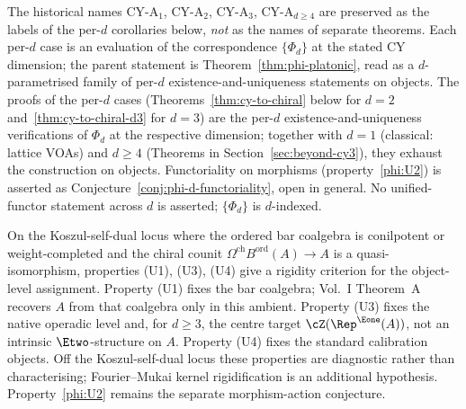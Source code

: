 \begin{remark}
\label{rem:phi-per-d-evaluations}
The historical names CY-A$_1$, CY-A$_2$, CY-A$_3$, CY-A$_{d \geq 4}$ are preserved as the labels of the per-$d$ corollaries below, \emph{not} as the names of separate theorems. Each per-$d$ case is an evaluation of the correspondence $\{\Phi_d\}$ at the stated CY dimension; the parent statement is Theorem~\ref{thm:phi-platonic}, read as a $d$-parametrised family of per-$d$ existence-and-uniqueness statements on objects. The proofs of the per-$d$ cases (Theorems~\ref{thm:cy-to-chiral} below for $d = 2$ and~\ref{thm:cy-to-chiral-d3} for $d = 3$) are the per-$d$ existence-and-uniqueness verifications of $\Phi_d$ at the respective dimension; together with $d = 1$ \textup{(}classical: lattice VOAs\textup{)} and $d \geq 4$ \textup{(}Theorems in Section~\textup{\ref{sec:beyond-cy3}}\textup{),} they exhaust the construction on objects. Functoriality on morphisms \textup{(}property~\textup{\ref{phi:U2}}\textup{)} is asserted as Conjecture~\textup{\ref{conj:phi-d-functoriality}}, open in general. No unified-functor statement across $d$ is asserted; $\{\Phi_d\}$ is $d$-indexed.
\end{remark}

\begin{remark}
\label{rem:phi-uniqueness}
On the Koszul-self-dual locus where the ordered bar coalgebra is
conilpotent or weight-completed and the chiral counit
\(\Omega^{\mathrm{ch}}B^{\mathrm{ord}}(A)\to A\) is a
quasi-isomorphism, properties \textup{(U1), (U3), (U4)} give a
rigidity criterion for the object-level assignment. Property
\textup{(U1)} fixes the bar coalgebra; Vol.~I Theorem~A recovers
\(A\) from that coalgebra only in this ambient. Property \textup{(U3)}
fixes the native operadic level and, for \(d\geq3\), the centre target
\(\cZ(\Rep^{\Eone}(A))\), not an intrinsic \(\Etwo\)-structure on
\(A\). Property \textup{(U4)} fixes the standard calibration objects.
Off the Koszul-self-dual locus these properties are diagnostic rather
than characterising; Fourier--Mukai kernel rigidification is an
additional hypothesis. Property~\textup{\ref{phi:U2}} remains the
separate morphism-action conjecture.
\end{remark}

